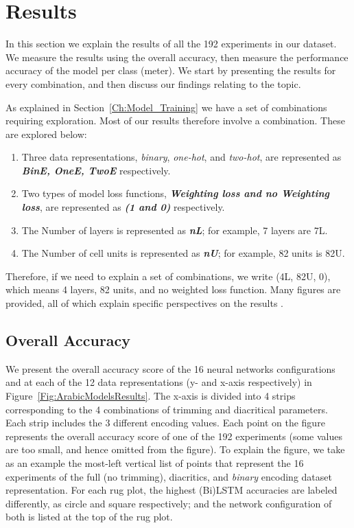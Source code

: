 {\begin{enumerate}
\end{enumerate}

\clearpage

\section{Results}\label{Sec:Results}

In this section we explain the results of all the 192 experiments in our dataset. We measure the results using the overall accuracy, then measure the performance accuracy of the model per class (meter). We start by presenting the results for every combination, and then discuss our findings relating to the topic.

As explained in Section~\ref{Ch:Model_Training} we have a set of combinations requiring exploration. Most of our results therefore involve a combination. These are explored below:

\begin{enumerate}

 \item Three data representations, \textit{binary}, \textit{one-hot}, and \textit{two-hot}, are represented as \textbf{\textit{BinE, OneE, TwoE}} respectively.
 \item Two types of model loss functions, \textbf{\textit{Weighting loss and no Weighting loss}}, are represented as \textbf{\textit{(1 and 0)}} respectively.
 \item The Number of layers is represented as \textbf{\textit{nL}}; for example, 7 layers are 7L.
 \item The Number of cell units is represented as \textbf{\textit{nU}}; for example, 82 units is 82U.

\end{enumerate}

Therefore, if we need to explain a set of combinations, we write (4L, 82U, 0), which means 4 layers, 82 units, and no weighted loss function. Many figures are provided, all of which explain specific perspectives on the results .

\subsection{Overall Accuracy}

We present the overall accuracy score of the 16 neural networks configurations and at each of the 12 data representations (y- and x-axis respectively) in Figure~\ref{Fig:ArabicModelsResults}. The x-axis is divided into 4 strips corresponding to the 4 combinations of trimming and diacritical parameters. Each strip includes the 3 different encoding values. Each point on the figure represents the overall accuracy score of one of the 192 experiments (some values are too small, and hence omitted from the figure). To explain the figure, we take as an example the most-left vertical list of points that represent the 16 experiments of the full (no trimming), diacritics, and \textit{binary} encoding dataset representation. For each rug plot, the highest (Bi)LSTM accuracies are labeled differently, as circle and square respectively; and the network configuration of both is listed at the top of the rug plot.

}
